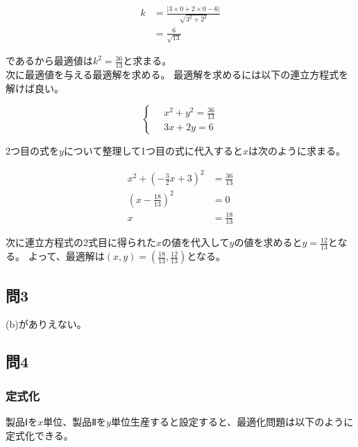 \begin{align}
    k   &= \frac{|3 \times 0 + 2 \times 0 - 6|}{\sqrt{3^2 + 2^2}} \\
        &= \frac{6}{\sqrt{13}}
\end{align}

\noindent であるから最適値は\(k^2 = \frac{36}{13}\)と求まる。 \\
\hspace{1em}次に最適値を与える最適解を求める。
最適解を求めるには以下の連立方程式を解けば良い。

\begin{equation} 
    \left\{ \,
        \begin{aligned}
            &   x^2 + y^2 = \frac{36}{13} \\
            &   3x + 2y = 6
        \end{aligned}
    \right.
\end{equation}

\noindent 2つ目の式を\(y\)について整理して1つ目の式に代入すると\(x\)は次のように求まる。

\begin{align}
    x^2 + \left(-\frac{3}{2}x + 3\right)^2  &= \frac{36}{13}    \\
    \left(x - \frac{18}{13}\right)^2        &= 0                \\
    x                                       &= \frac{18}{13}
\end{align}

\noindent 次に連立方程式の2式目に得られた\(x\)の値を代入して\(y\)の値を求めると\(y = \frac{12}{13}\)となる。
よって、最適解は\(\left(x, y\right) = \left(\frac{18}{13}, \frac{12}{13}\right)\)となる。

\subsection{問3}
\hspace{1em}(b)がありえない。

\subsection{問4}
\subsubsection{定式化}
\hspace{1em}製品Ⅰを\(x\)単位、製品Ⅱを\(y\)単位生産すると設定すると、最適化問題は以下のように定式化できる。

